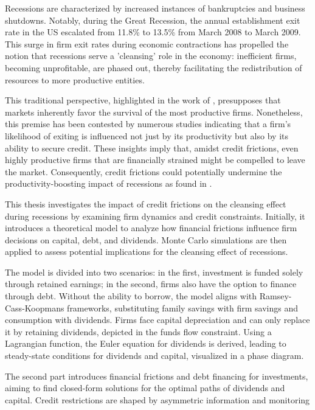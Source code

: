 Recessions are characterized by increased instances of bankruptcies and business shutdowns. Notably, during the Great
Recession, the annual establishment exit rate in the US escalated from 11.8\% to 13.5\% from March 2008 to March 2009.
This surge in firm exit rates during economic contractions has propelled the notion that recessions serve a 'cleansing'
role in the economy: inefficient firms, becoming unprofitable, are phased out, thereby facilitating the redistribution
of resources to more productive entities. 
\par
This traditional perspective, highlighted in the work of \cite{CabHarm94}, presupposes that markets inherently favor the
survival of the most productive firms. Nonetheless, this premise has been contested by numerous studies indicating that
a firm's likelihood of exiting is influenced not just by its productivity but also by its ability to secure credit.
These insights imply that, amidst credit frictions, even highly productive firms that are financially strained might be
compelled to leave the market. Consequently, credit frictions could potentially undermine the productivity-boosting
impact of recessions as found in \cite{OsePap17}. 
\par
This thesis investigates the impact of credit frictions on the cleansing effect during recessions by examining firm
dynamics and credit constraints. Initially, it introduces a theoretical model to analyze how financial frictions
influence firm decisions on capital, debt, and dividends. Monte Carlo simulations are then applied to assess potential
implications for the cleansing effect of recessions. 
\par
The model is divided into two scenarios: in the first, investment is funded solely through retained earnings; in the
second, firms also have the option to finance through debt. Without the ability to borrow, the model aligns with
Ramsey-Cass-Koopmans frameworks, substituting family savings with firm savings and consumption with dividends. Firms
face capital depreciation and can only replace it by retaining dividends, depicted in the funds flow constraint. Using a
Lagrangian function, the Euler equation for dividends is derived, leading to steady-state conditions for dividends and
capital, visualized in a phase diagram. 
\par
The second part introduces financial frictions and debt financing for investments, aiming to find closed-form solutions
for the optimal paths of dividends and capital. Credit restrictions are shaped by asymmetric information and monitoring
